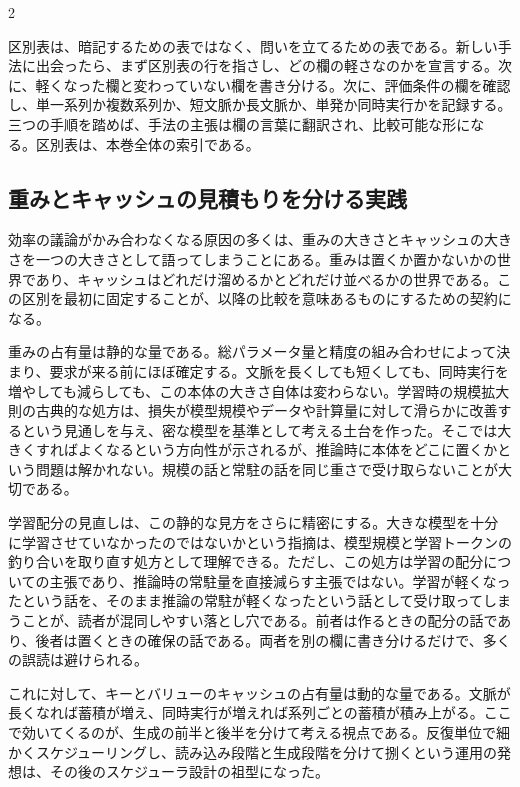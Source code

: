 \documentclass[lualatex,a4paper,10pt]{jlreq}
\begin{document}
\begin{multicols}{2}
\begin{themeoverview}[欄の対応表の使い方]
区別表は、暗記するための表ではなく、問いを立てるための表である。新しい手法に出会ったら、まず区別表の行を指さし、どの欄の軽さなのかを宣言する。次に、軽くなった欄と変わっていない欄を書き分ける。次に、評価条件の欄を確認し、単一系列か複数系列か、短文脈か長文脈か、単発か同時実行かを記録する。三つの手順を踏めば、手法の主張は欄の言葉に翻訳され、比較可能な形になる。区別表は、本巻全体の索引である。
\end{themeoverview}

\subsection{重みとキャッシュの見積もりを分ける実践}
効率の議論がかみ合わなくなる原因の多くは、重みの大きさとキャッシュの大きさを一つの大きさとして語ってしまうことにある。重みは置くか置かないかの世界であり、キャッシュはどれだけ溜めるかとどれだけ並べるかの世界である。この区別を最初に固定することが、以降の比較を意味あるものにするための契約になる。

重みの占有量は静的な量である。総パラメータ量と精度の組み合わせによって決まり、要求が来る前にほぼ確定する。文脈を長くしても短くしても、同時実行を増やしても減らしても、この本体の大きさ自体は変わらない。学習時の規模拡大則の古典的な処方は、損失が模型規模やデータや計算量に対して滑らかに改善するという見通しを与え、密な模型を基準として考える土台を作った\autocite{kaplan2020}。そこでは大きくすればよくなるという方向性が示されるが、推論時に本体をどこに置くかという問題は解かれない。規模の話と常駐の話を同じ重さで受け取らないことが大切である。

学習配分の見直しは、この静的な見方をさらに精密にする。大きな模型を十分に学習させていなかったのではないかという指摘は、模型規模と学習トークンの釣り合いを取り直す処方として理解できる\autocite{chinchilla}。ただし、この処方は学習の配分についての主張であり、推論時の常駐量を直接減らす主張ではない。学習が軽くなったという話を、そのまま推論の常駐が軽くなったという話として受け取ってしまうことが、読者が混同しやすい落とし穴である。前者は作るときの配分の話であり、後者は置くときの確保の話である。両者を別の欄に書き分けるだけで、多くの誤読は避けられる。

これに対して、キーとバリューのキャッシュの占有量は動的な量である。文脈が長くなれば蓄積が増え、同時実行が増えれば系列ごとの蓄積が積み上がる。ここで効いてくるのが、生成の前半と後半を分けて考える視点である。反復単位で細かくスケジューリングし、読み込み段階と生成段階を分けて捌くという運用の発想は、その後のスケジューラ設計の祖型になった\autocite{orca}。


\end{multicols}
\end{document}
